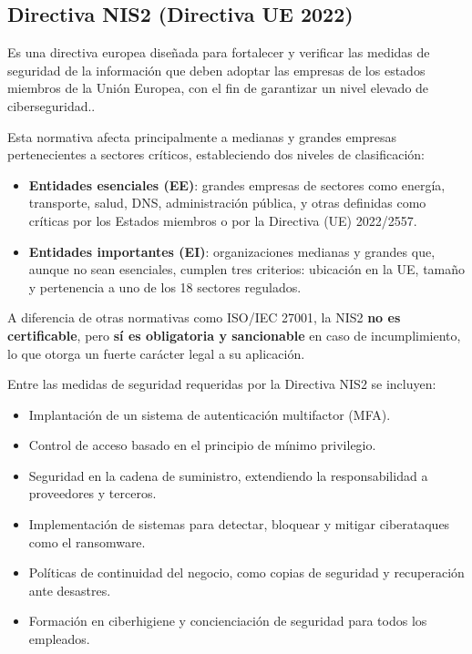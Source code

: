 \documentclass[a4paper, 10pt]{article}
\begin{document}
\subsection*{Directiva NIS2 (Directiva UE 2022)}
Es una directiva europea diseñada para fortalecer y verificar las medidas de seguridad de la información que deben adoptar las empresas de los estados miembros de la Unión Europea, con el fin de garantizar un nivel elevado de ciberseguridad.\cite{nis2}.
\par\vspace{0.5cm}

Esta normativa afecta principalmente a medianas y grandes empresas pertenecientes a sectores críticos, estableciendo dos niveles de clasificación:
\begin{itemize}
\item \textbf{Entidades esenciales (EE)}: grandes empresas de sectores como energía, transporte, salud, DNS, administración pública, y otras definidas como críticas por los Estados miembros o por la Directiva (UE) 2022/2557.
\item \textbf{Entidades importantes (EI)}: organizaciones medianas y grandes que, aunque no sean esenciales, cumplen tres criterios: ubicación en la UE, tamaño y pertenencia a uno de los 18 sectores regulados.
\end{itemize}

A diferencia de otras normativas como ISO/IEC 27001, la NIS2 \textbf{no es certificable}, pero \textbf{sí es obligatoria y sancionable} en caso de incumplimiento, lo que otorga un fuerte carácter legal a su aplicación.
\par\vspace{0.5cm}

Entre las medidas de seguridad requeridas por la Directiva NIS2 se incluyen:
\begin{itemize}
\item Implantación de un sistema de autenticación multifactor (MFA).
\item Control de acceso basado en el principio de mínimo privilegio.
\item Seguridad en la cadena de suministro, extendiendo la responsabilidad a proveedores y terceros.
\item Implementación de sistemas para detectar, bloquear y mitigar ciberataques como el ransomware.
\item Políticas de continuidad del negocio, como copias de seguridad y recuperación ante desastres.
\item Formación en ciberhigiene y concienciación de seguridad para todos los empleados.
\end{itemize}
\end{document}
